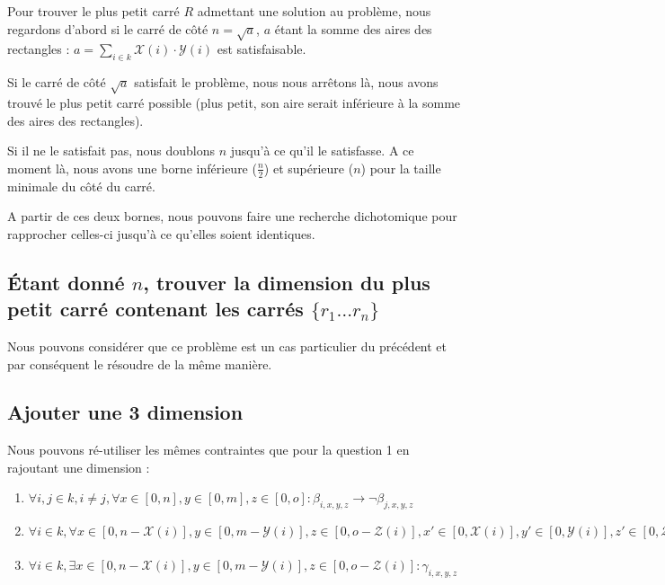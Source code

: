 \documentclass[a4paper]{article}
\begin{document}
Pour trouver le plus petit carré $R$ admettant une solution au problème, nous regardons d'abord si le carré de côté $n=\sqrt{a}$, $a$ étant la somme des aires des rectangles : $a = \sum_{i \in k} \mathcal{X}(i) \cdot \mathcal{Y}(i)$ est satisfaisable.

Si le carré de côté $\sqrt{a}$ satisfait le problème, nous nous arrêtons là, nous avons trouvé le plus petit carré possible (plus petit, son aire serait inférieure à la somme des aires des rectangles).

Si il ne le satisfait pas, nous doublons $n$ jusqu'à ce qu'il le satisfasse. A ce moment là, nous avons une borne inférieure ($\frac{n}{2}$) et supérieure ($n$) pour la taille minimale du côté du carré.

A partir de ces deux bornes, nous pouvons faire une recherche dichotomique pour rapprocher celles-ci jusqu'à ce qu'elles soient identiques.

\subsection{Étant donné $n$, trouver la dimension du plus petit carré contenant les carrés $\{r_1 \ldots r_n \}$}

Nous pouvons considérer que ce problème est un cas particulier du précédent et par conséquent le résoudre de la même manière.

\subsection{Ajouter une 3 dimension}
Nous pouvons ré-utiliser les mêmes contraintes que pour la question 1 en rajoutant une dimension :

\begin{enumerate}
  \item $\forall i,j \in k, i \neq j, \forall x \in [0,n], y \in [0,m], z \in [0,o] : \beta_{i, x, y, z} \rightarrow \lnot \beta_{j, x, y, z}$

  \item $
  \forall i \in k,
  \forall x \in [0, n - \mathcal{X}(i)] , y \in [0, m - \mathcal{Y}(i)], z \in [0, o - \mathcal{Z}(i)],
    x' \in [0, \mathcal{X}(i)], y' \in [0, \mathcal{Y}(i)], z' \in [0, \mathcal{Z}(i)]  :
    \gamma_{i, x, y, z} \rightarrow \beta_{i, x', y', z'}
  $

  \item $\forall i \in k, \exists x \in  [0, n - \mathcal{X}(i)], y \in [0, m - \mathcal{Y}(i)], z \in [0, o - \mathcal{Z}(i)] :
  \gamma_{i, x, y, z}$
\end{enumerate}
\vspace{1em}
\end{document}
